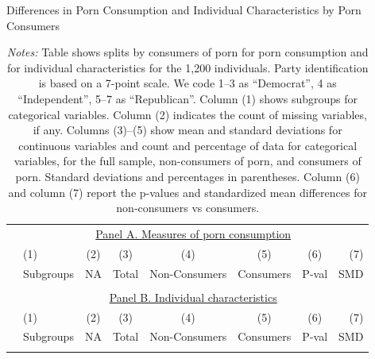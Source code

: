 \documentclass[12pt, letterpaper]{article}
\begin{document}
\begin{table}[ht] \centering \small \setlength\tabcolsep{5 pt}
	\caption{Differences in Porn Consumption and Individual Characteristics by Porn Consumers}
	\label{tab:characteristics_split_by_porn_consumers}
	\begin{adjustbox}{max width=\textwidth}
		\begin{tabular}{@{\hspace{0\tabcolsep}}llrcccrr@{\hspace{0\tabcolsep}}}
			\toprule
			&\multicolumn{7}{c}{\underline{Panel A. Measures of porn consumption}}\\
			&\multicolumn{1}{l}{(1)}&\multicolumn{1}{c}{(2)}&\multicolumn{1}{c}{(3)}&\multicolumn{1}{c}{(4)}&\multicolumn{1}{c}{(5)}&\multicolumn{1}{c}{(6)}&\multicolumn{1}{r}{(7)}\\			
			&\multicolumn{1}{l}{Subgroups}&\multicolumn{1}{c}{NA}&\multicolumn{1}{c}{Total}&\multicolumn{1}{c}{Non-Consumers}&\multicolumn{1}{c}{Consumers}&\multicolumn{1}{c}{P-val}&\multicolumn{1}{r}{SMD}\\
			\cmidrule{2-8}
			\\
			\cmidrule{2-8}
			&\multicolumn{7}{c}{\underline{Panel B. Individual characteristics}}\\
			&\multicolumn{1}{l}{(1)}&\multicolumn{1}{c}{(2)}&\multicolumn{1}{c}{(3)}&\multicolumn{1}{c}{(4)}&\multicolumn{1}{c}{(5)}&\multicolumn{1}{c}{(6)}&\multicolumn{1}{r}{(7)}\\			
			&\multicolumn{1}{l}{Subgroups}&\multicolumn{1}{c}{NA}&\multicolumn{1}{c}{Total}&\multicolumn{1}{c}{Non-Consumers}&\multicolumn{1}{c}{Consumers}&\multicolumn{1}{c}{P-val}&\multicolumn{1}{r}{SMD}\\
			\cmidrule{2-8}
			\\
			\bottomrule
		\end{tabular}
	\end{adjustbox}
	\caption*{\scriptsize \emph{Notes:}
		Table shows splits by consumers of porn for porn consumption and for individual characteristics for the 1,200 individuals.
		Party identification is based on a 7-point scale. We code 1--3 as ``Democrat'', 4 as ``Independent'', 5--7 as ``Republican''.
		Column (1) shows subgroups for categorical variables.
		Column (2) indicates the count of missing variables, if any.
		Columns (3)--(5) show mean and standard deviations for continuous variables and count and percentage of data for categorical variables, for the full sample, non-consumers of porn, and consumers of porn.
		Standard deviations and percentages in parentheses.
		Column (6) and column (7) report the p-values and standardized mean differences for non-consumers vs consumers.
	}
\end{table}
\end{document}
